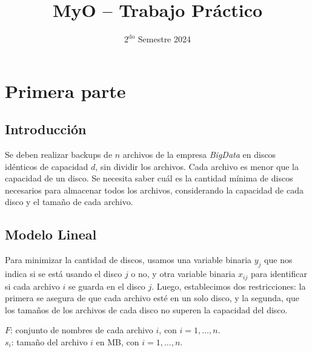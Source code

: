 \documentclass[11pt, a4paper, pdftex]{article}
\title{
	\huge MyO -- Trabajo Práctico\\
}
\author{
	\Mati \and \Xime \and \Lucifer \and \Lu
}
\date{\small $\text{2}^{\text{do}}$ Semestre 2024
}
\begin{document}
\renewcommand{\contentsname}{Contenidos}
\renewcommand{\listfigurename}{Listado de Figuras}
\renewcommand{\listtablename}{Listado de Tablas}
\renewcommand{\tablename}{Tabla}

\newcommand{\minimize}{\texttt{Minimize}\quad\,\,}
\newcommand{\maximize}{\texttt{Maximize}\quad\,\,}
\newcommand{\subjto}{\texttt{Subject to}\quad}

\maketitle

\tableofcontents

\newpage
\section{Primera parte}

\subsection{Introducción}

Se deben realizar backups de $n$ archivos de la empresa \emph{BigData}
en discos idénticos de capacidad $d$, sin dividir los archivos. Cada
archivo es menor que la capacidad de un disco. Se necesita saber cuál es
la cantidad mínima de discos necesarios para almacenar todos los
archivos, considerando la capacidad de cada disco y el tamaño de cada
archivo. 

\subsection{Modelo Lineal}

Para minimizar la cantidad de discos, usamos una variable binaria
$y_{j}$ que nos indica si se está usando el disco $j$ o no, y otra
variable binaria $x_{ij}$ para identificar si cada archivo $i$ se guarda
en el disco $j$. Luego, establecimos dos restricciones: la primera se
asegura de que cada archivo esté en un solo disco, y la segunda, que los
tamaños de los archivos de cada disco no superen la capacidad del disco.

$F$: conjunto de nombres de cada archivo $i$, con $i = 1, \ldots, n$. \\

$s_{i}$: tamaño del archivo $i$ en MB, con $i = 1, \ldots, n$. \\
\end{document}
